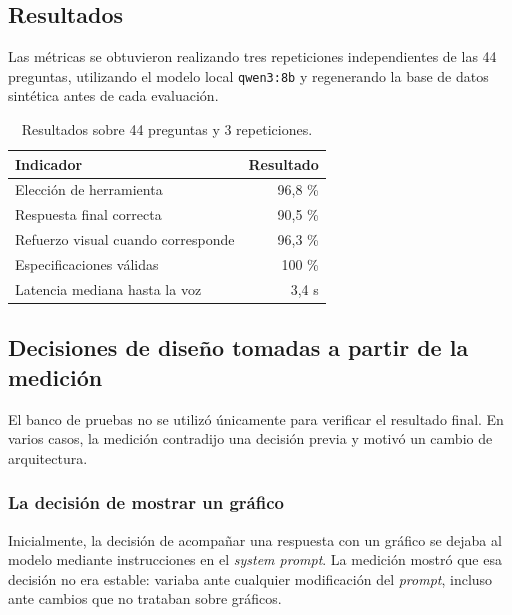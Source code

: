 \subsection{Resultados}

Las métricas se obtuvieron realizando tres repeticiones independientes de las 44 
preguntas, utilizando el modelo local \texttt{qwen3:8b} y regenerando la base de 
datos sintética antes de cada evaluación.

\begin{table}[h]
\centering
\begin{tabular}{lr}
\toprule
\textbf{Indicador} & \textbf{Resultado} \\
\midrule
Elección de herramienta            & 96,8 \% \\
Respuesta final correcta           & 90,5 \% \\
Refuerzo visual cuando corresponde & 96,3 \% \\
Especificaciones válidas           & 100 \% \\
Latencia mediana hasta la voz      & 3,4 s \\
\bottomrule
\end{tabular}
\caption{Resultados sobre 44 preguntas y 3 repeticiones.}
\end{table}

\subsection{Decisiones de diseño tomadas a partir de la medición}

El banco de pruebas no se utilizó únicamente para verificar el resultado final.
En varios casos, la medición contradijo una decisión previa y motivó un cambio
de arquitectura.

\subsubsection{La decisión de mostrar un gráfico}

Inicialmente, la decisión de acompañar una respuesta con un gráfico se dejaba al
modelo mediante instrucciones en el \textit{system prompt}. La medición mostró
que esa decisión no era estable: variaba ante cualquier modificación del
\textit{prompt}, incluso ante cambios que no trataban sobre gráficos.

